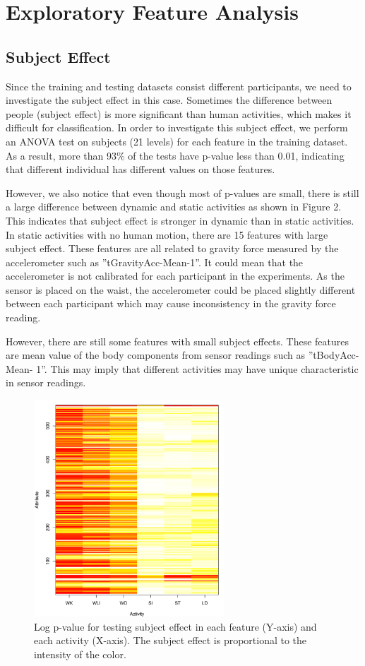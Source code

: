 \documentclass[conference]{IEEEtran}
\begin{document}
\section{Exploratory Feature Analysis}
\subsection{Subject Effect}
Since the training and testing datasets consist different participants, we need to investigate the subject effect in this case. Sometimes the difference between people (subject effect) is more significant than human activities, which makes it difficult for classification. In order to investigate this subject effect, we perform an ANOVA test on subjects (21 levels) for each feature in the training dataset. As a result, more than 93$\%$ of the tests have p-value less than 0.01, indicating that different individual has different values on those features. 

However, we also notice that even though most of p-values are small, there is still a large difference between dynamic and static activities as shown in Figure 2. This indicates that subject effect is stronger in dynamic than in static activities. In static activities with no human motion, there are 15 features with large subject effect. These features are all related to gravity force measured by the accelerometer such as ”tGravityAcc-Mean-1”. It could mean that the accelerometer is not calibrated for each participant in the experiments. As the sensor is placed on the waist, the accelerometer could be placed slightly different between each participant which may cause inconsistency in the gravity force reading. 

However, there are still some features with small subject effects. These features are mean value of the body components from sensor readings such as ”tBodyAcc-Mean- 1”. This may imply that different activities may have unique characteristic in sensor readings. 

\begin{figure}[!ht]
\centering
\includegraphics[width=2.8in]{figure2.pdf}
\caption{Log p-value for testing subject effect in each feature (Y-axis) and each activity (X-axis). The subject effect is proportional to the intensity of the color.
}
\label{fig_sim}
\end{figure}
\end{document}
